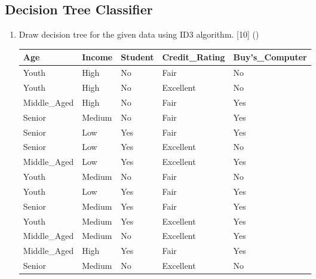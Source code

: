 \documentclass[12pt]{article}
\begin{document}
  \subsection{Decision Tree Classifier}
    \begin{enumerate}[topsep=0pt, noitemsep]
      \item Draw decision tree for the given data using ID3 algorithm. \hfill [10] ()\\
        \small
        \begin{tabular}{|l|l|l|l|l|}
          \hline
          Age & Income & Student & Credit\_Rating & Buy's\_Computer \\ \hline
          Youth & High & No & Fair & No \\ \hline
          Youth & High & No & Excellent & No \\ \hline
          Middle\_Aged & High & No & Fair & Yes \\ \hline
          Senior & Medium & No & Fair & Yes \\ \hline
          Senior & Low & Yes & Fair & Yes \\ \hline
          Senior & Low & Yes & Excellent & No \\ \hline
          Middle\_Aged & Low & Yes & Excellent & Yes \\ \hline
          Youth & Medium & No & Fair & No \\ \hline
          Youth & Low & Yes & Fair & Yes \\ \hline
          Senior & Medium & Yes & Fair & Yes \\ \hline
          Youth & Medium & Yes & Excellent & Yes \\ \hline
          Middle\_Aged & Medium & No & Excellent & Yes \\ \hline
          Middle\_Aged & High & Yes & Fair & Yes \\ \hline
          Senior & Medium & No & Excellent & No \\ \hline
        \end{tabular}
        \normalsize


\end{enumerate}
\end{document}
